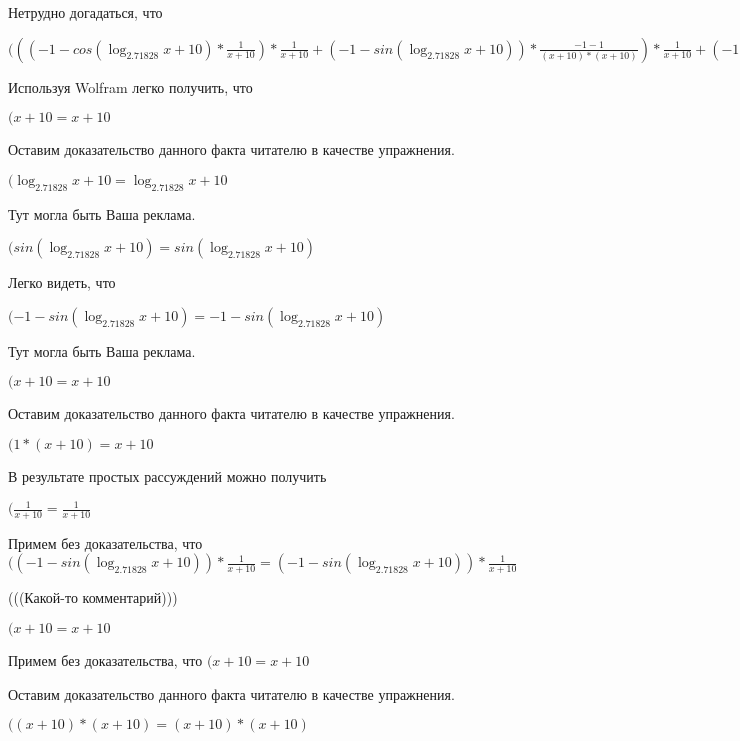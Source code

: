 \documentclass[12pt,a4paper,fleqn]{article}
\theoremstyle{definition}
\begin{document}
Нетрудно догадаться, что

$((( -1  - cos(\log_{ 2.71828 }{ x  +  10 }) * \frac{ 1 }{ x  +  10 }
) * \frac{ 1 }{ x  +  10 }
 + ( -1  - sin(\log_{ 2.71828 }{ x  +  10 })) * \frac{ -1  -  1 }{( x  +  10 ) * ( x  +  10 )}
) * \frac{ 1 }{ x  +  10 }
 + ( -1  - sin(\log_{ 2.71828 }{ x  +  10 })) * \frac{ 1 }{ x  +  10 }
 * \frac{ -1  -  1 }{( x  +  10 ) * ( x  +  10 )}
 = (( -1  - cos(\log_{ 2.71828 }{ x  +  10 }) * \frac{ 1 }{ x  +  10 }
) * \frac{ 1 }{ x  +  10 }
 + ( -1  - sin(\log_{ 2.71828 }{ x  +  10 })) * \frac{ -1  -  1 }{( x  +  10 ) * ( x  +  10 )}
) * \frac{ 1 }{ x  +  10 }
 + ( -1  - sin(\log_{ 2.71828 }{ x  +  10 })) * \frac{ 1 }{ x  +  10 }
 * \frac{ -1  -  1 }{( x  +  10 ) * ( x  +  10 )}
$

Используя Wolfram легко получить, что

$( x  +  10  =  x  +  10 $

Оставим доказательство данного факта читателю в качестве упражнения.

$(\log_{ 2.71828 }{ x  +  10 } = \log_{ 2.71828 }{ x  +  10 }$

Тут могла быть Ваша реклама.

$(sin(\log_{ 2.71828 }{ x  +  10 }) = sin(\log_{ 2.71828 }{ x  +  10 })$

Легко видеть, что

$( -1  - sin(\log_{ 2.71828 }{ x  +  10 }) =  -1  - sin(\log_{ 2.71828 }{ x  +  10 })$

Тут могла быть Ваша реклама.

$( x  +  10  =  x  +  10 $

Оставим доказательство данного факта читателю в качестве упражнения.

$( 1  * ( x  +  10 ) =  x  +  10 $

В результате простых рассуждений можно получить

$(\frac{ 1 }{ x  +  10 }
 = \frac{ 1 }{ x  +  10 }
$

Примем без доказательства, что
$(( -1  - sin(\log_{ 2.71828 }{ x  +  10 })) * \frac{ 1 }{ x  +  10 }
 = ( -1  - sin(\log_{ 2.71828 }{ x  +  10 })) * \frac{ 1 }{ x  +  10 }
$

(((Какой-то комментарий)))

$( x  +  10  =  x  +  10 $

Примем без доказательства, что
$( x  +  10  =  x  +  10 $

Оставим доказательство данного факта читателю в качестве упражнения.

$(( x  +  10 ) * ( x  +  10 ) = ( x  +  10 ) * ( x  +  10 )$
\end{document}
